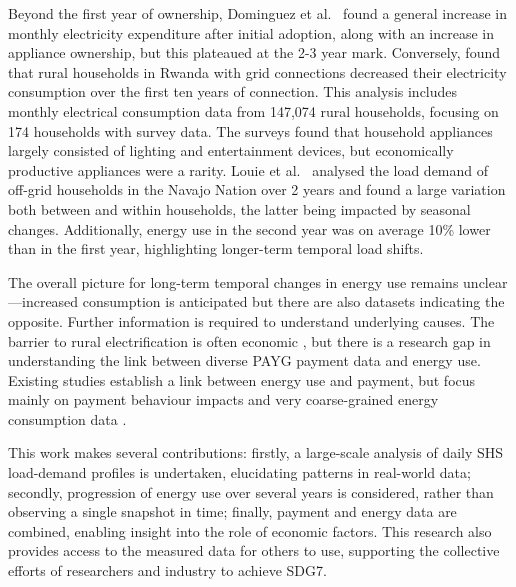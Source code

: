 Beyond the first year of ownership, Dominguez et al.\ \cite{Dominguez2021UnderstandingHouseholds} found a general increase in monthly electricity expenditure after initial adoption, along with an increase in appliance ownership, but this plateaued at the 2-3 year mark. Conversely, \cite{Masselus202410Rwanda} found that rural households in Rwanda with grid connections decreased their electricity consumption over the first ten years of connection. This analysis includes monthly electrical consumption data from 147,074 rural households, focusing on 174 households with survey data. The surveys found that household appliances largely consisted of lighting and entertainment devices, but economically productive appliances were a rarity. Louie et al.\ \cite{Louie2023DailyNation} analysed the load demand of off-grid households in the Navajo Nation over 2 years and found a large variation both between and within households, the latter being impacted by seasonal changes. Additionally, energy use in the second year was on average 10\% lower than in the first year, highlighting longer-term temporal load shifts. 

The overall picture for long-term temporal changes in energy use remains unclear---increased consumption is anticipated but there are also datasets indicating the opposite. Further information is required to understand underlying causes. The barrier to rural electrification is often economic \cite{Blimpo2020WhyAfrica, Kizilcec2020SolarAfrica}, but there is a research gap in understanding the link between diverse PAYG payment data \cite{Mergulhao2023HowKenya} and energy use. Existing studies establish a link between energy use and payment, but focus mainly on payment behaviour impacts \cite{Guajardo2019HowEconomies} and very coarse-grained energy consumption data \cite{Lukuyu2023PurchasingAfrica}.

This work makes several contributions: firstly, a large-scale analysis of daily SHS load-demand profiles is undertaken, elucidating patterns in real-world data; secondly, progression of energy use over several years is considered, rather than observing a single snapshot in time; finally, payment and energy data are combined, enabling insight into the role of economic factors. This research also provides access to the measured data for others to use, supporting the collective efforts of researchers and industry to achieve SDG7.